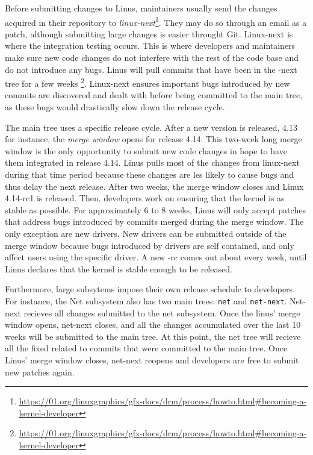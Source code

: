 Before submitting changes to Linus, maintainers usually send the changes acquired in their repository to \textit{linux-next}\footnote{\url{https://01.org/linuxgraphics/gfx-docs/drm/process/howto.html\#becoming-a-kernel-developer}}. They may do so through an email as a patch, although submitting large changes is easier throught Git. Linux-next is where the integration testing occurs. This is where developers and maintainers make sure new code changes do not interfere with the rest of the code base and do not introduce any bugs. Linus will pull commits that have been in the -next tree for a few weeks \footnote{\url{https://01.org/linuxgraphics/gfx-docs/drm/process/howto.html\#becoming-a-kernel-developer}}. Linux-next ensures important bugs introduced by new commits are discovered and dealt with before being committed to the main tree, as these bugs would drastically slow down the release cycle. 


The main tree uses a specific release cycle. After a new version is released, 4.13 for instance, the \textit{merge window} opens for release 4.14. This two-week long merge window is the only opportunity to submit new code changes in hope to have them integrated in release 4.14. Linus pulls most of the changes from linux-next during that time period because these changes are les likely to cause bugs and thus delay the next release. After two weeks, the merge window closes and Linux 4.14-rc1 is released. Then, developers work on ensuring that the kernel is as stable as possible. For approximately 6 to 8 weeks, Linus will only accept patches that address bugs introduced by commits merged during the merge window. The only exception are new drivers. New drivers can be submitted outside of the merge window because bugs introduced by drivers are self contained, and only affect users using the specific driver. A new -rc comes out about every week, until Linus declares that the kernel is stable enough to be released. 

Furthermore, large subsytems impose their own release schedule to developers. For instance, the Net subsystem also has two main trees: \texttt{net} and \texttt{net-next}. Net-next recieves all changes submitted to the net subsystem. Once the linus' merge window opens, net-next closes, and all the changes accumulated over the last 10 weeks will be submitted to the main tree. At this point, the net tree will recieve all the fixed related to commits that were committed to the main tree. Once Linus' merge window closes, net-next reopens and developers are free to submit new patches again. 

